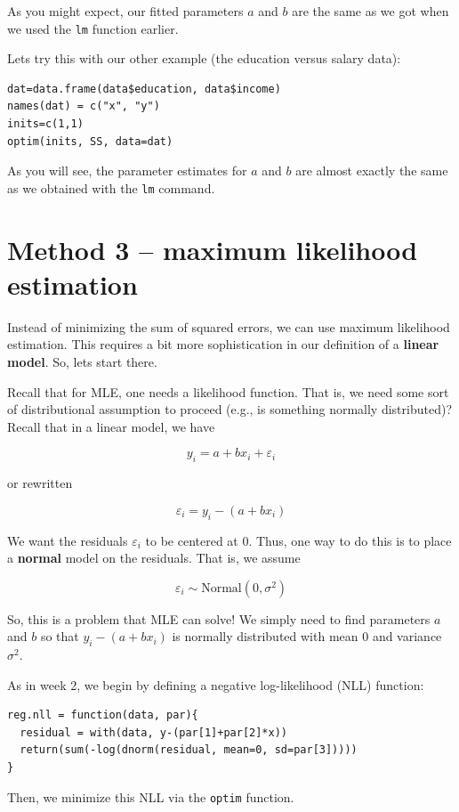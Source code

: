 \documentclass[11pt]{article}
\begin{document}
As you might expect, our fitted parameters $a$ and $b$ are the same as we got when we used the \texttt{lm} function earlier.

Lets try this with our other example (the education versus salary data):

\begin{verbatim}
dat=data.frame(data$education, data$income)
names(dat) = c("x", "y")
inits=c(1,1)
optim(inits, SS, data=dat)
\end{verbatim}

As you will see, the parameter estimates for $a$ and $b$ are almost exactly the same as we obtained with the \texttt{lm} command.

\section*{Method 3 -- maximum likelihood estimation}
\label{sec-6}

Instead of minimizing the sum of squared errors, we can use maximum likelihood estimation.  This requires a bit more sophistication in our definition of a \textbf{linear model}.  So, lets start there.

Recall that for MLE, one needs a likelihood function.  That is, we need some sort of distributional assumption to proceed (e.g., is something normally distributed)?  Recall that in a linear model, we have

\[
y_i = a+bx_i + \varepsilon_i
\]

or rewritten

\[
\varepsilon_i = y_i - (a+bx_i)
\]

We want the residuals $\varepsilon_i$ to be centered at 0.  Thus, one way to do this is to place a \textbf{normal} model on the residuals.  That is, we assume

\[
\varepsilon_i \sim \text{Normal}(0, \sigma^2)
\]

So, this is a problem that MLE can solve!  We simply need to find parameters $a$ and $b$ so that $y_i-(a+bx_i)$ is normally distributed with mean 0 and variance $\sigma^2$.

As in week 2, we begin by defining a negative log-likelihood (NLL) function:

\begin{verbatim}
reg.nll = function(data, par){
  residual = with(data, y-(par[1]+par[2]*x))
  return(sum(-log(dnorm(residual, mean=0, sd=par[3]))))
}
\end{verbatim}

Then, we minimize this NLL via the \texttt{optim} function.
\end{document}
